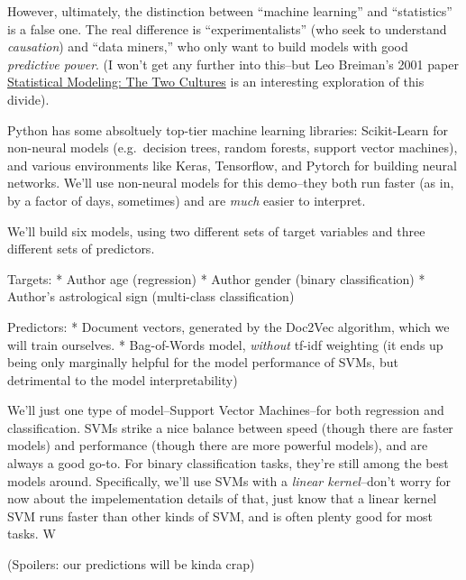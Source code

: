 \documentclass[11pt]{article}
\begin{document}
However, ultimately, the distinction between ``machine learning'' and
``statistics'' is a false one. The real difference is
``experimentalists'' (who seek to understand \emph{causation}) and
``data miners,'' who only want to build models with good
\emph{predictive power}. (I won't get any further into this--but Leo
Breiman's 2001 paper
\href{https://projecteuclid.org/euclid.ss/1009213726}{Statistical
Modeling: The Two Cultures} is an interesting exploration of this
divide).

Python has some absoltuely top-tier machine learning libraries:
Scikit-Learn for non-neural models (e.g.~decision trees, random forests,
support vector machines), and various environments like Keras,
Tensorflow, and Pytorch for building neural networks. We'll use
non-neural models for this demo--they both run faster (as in, by a
factor of days, sometimes) and are \emph{much} easier to interpret.

We'll build six models, using two different sets of target variables and
three different sets of predictors.

Targets: * Author age (regression) * Author gender (binary
classification) * Author's astrological sign (multi-class
classification)

Predictors: * Document vectors, generated by the Doc2Vec algorithm,
which we will train ourselves. * Bag-of-Words model, \emph{without}
tf-idf weighting (it ends up being only marginally helpful for the model
performance of SVMs, but detrimental to the model interpretability)

We'll just one type of model--Support Vector Machines--for both
regression and classification. SVMs strike a nice balance between speed
(though there are faster models) and performance (though there are more
powerful models), and are always a good go-to. For binary classification
tasks, they're still among the best models around. Specifically, we'll
use SVMs with a \emph{linear kernel}--don't worry for now about the
impelementation details of that, just know that a linear kernel SVM runs
faster than other kinds of SVM, and is often plenty good for most tasks.
W

(Spoilers: our predictions will be kinda crap)
\end{document}
